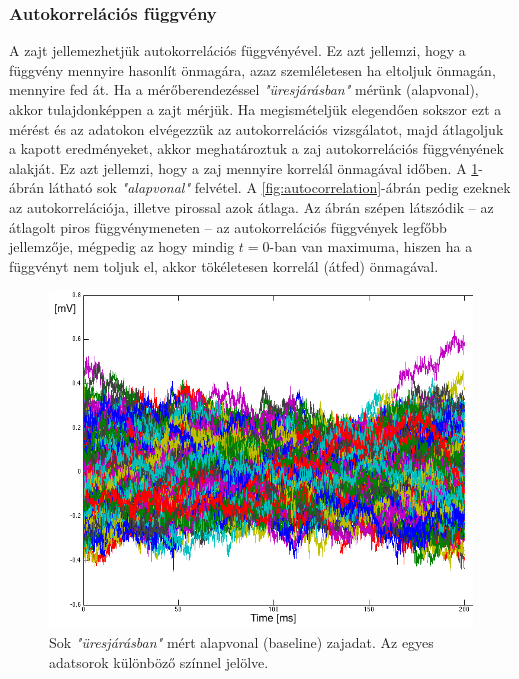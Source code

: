 \subsubsection{Autokorrelációs függvény}
A zajt jellemezhetjük autokorrelációs függvényével. Ez azt jellemzi, hogy a függvény mennyire hasonlít önmagára, azaz szemléletesen ha eltoljuk önmagán, mennyire fed át. Ha a mérőberendezéssel \textit{"üresjárásban"} mérünk (alapvonal), akkor tulajdonképpen a zajt mérjük. Ha megismételjük elegendően sokszor ezt a mérést és az adatokon elvégezzük az autokorrelációs vizsgálatot, majd átlagoljuk a kapott eredményeket, akkor meghatároztuk a zaj autokorrelációs függvényének alakját. Ez azt jellemzi, hogy a zaj mennyire korrelál önmagával időben. A \ref{fig:baseline}-ábrán látható sok \textit{"alapvonal"} felvétel. A \ref{fig:autocorrelation}-ábrán pedig ezeknek az autokorrelációja, illetve pirossal azok átlaga. Az ábrán szépen látszódik -- az átlagolt piros függvénymeneten -- az autokorrelációs függvények legfőbb jellemzője, mégpedig az hogy mindig $t=0$-ban van maximuma, hiszen ha a függvényt nem toljuk el, akkor tökéletesen korrelál (átfed) önmagával.

\begin{figure}[h!]
	\centering
	\includegraphics[width=0.7\linewidth]{fig/noise/bas2}
	\caption[Zaj baseline]{Sok \textit{"üresjárásban"} mért alapvonal (baseline) zajadat. Az egyes adatsorok különböző színnel jelölve.}
	\label{fig:baseline}
\end{figure}

